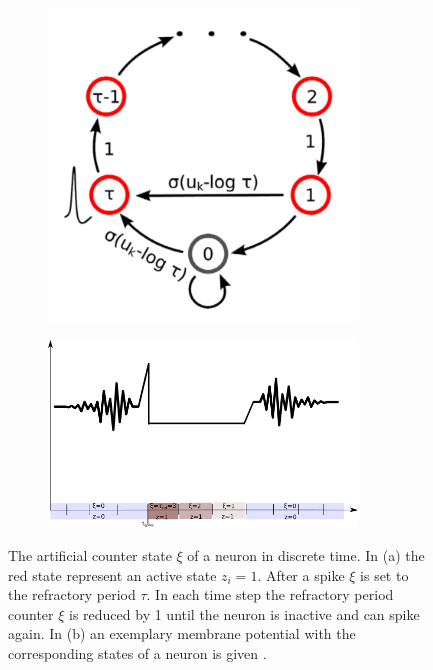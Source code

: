 \begin{figure}
	\centering
	\begin{subfigure}[t]{.39\textwidth}
  		\centering
  		\includegraphics[width=0.9\textwidth]{imgs/snn_sample2.png}
  		\caption{}
  		\label{fig:snnsamp2sub1}
	\end{subfigure}
	\begin{subfigure}[t]{.59\textwidth}
  		\centering
  		\includegraphics[width=0.9\textwidth]{imgs/sampl_bsp.png}
  		\caption{}
  		\label{fig:snnsamp2sub1}
	\end{subfigure}
    \caption[The artificial counter state of a neuron in discrete time.]{The artificial counter state $\xi$ of a neuron in discrete time. In (a) the red state represent an active state $z_i = 1$. After a spike $\xi$ is set to the refractory period $\tau$. In each time step the refractory period counter $\xi$ is reduced by 1 until the neuron is inactive and can spike again. In (b) an exemplary membrane potential with the corresponding states of a neuron is given \cite{Buesing2011}.}
	\label{fig:snnsamp2}
\end{figure}




